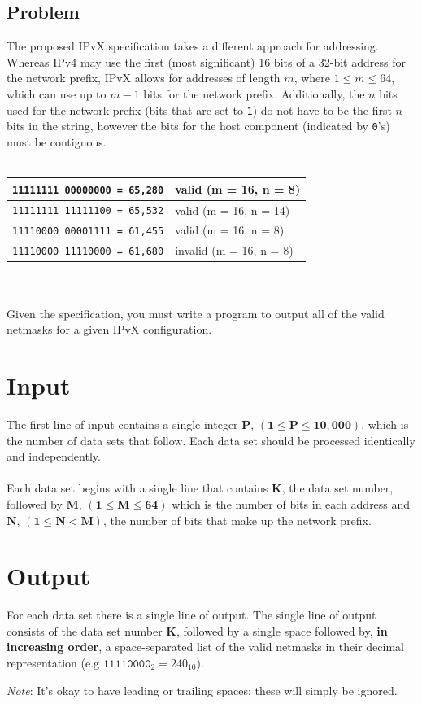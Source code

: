 \documentclass[11pt]{article}
\begin{document}
\subsection{Problem}
The proposed IPvX specification takes a different approach for addressing. Whereas IPv4 may use the first (most significant) 16 bits of a 32-bit address for the network prefix, IPvX allows for addresses of length $m$, where $1 \le m \le 64$, which can use up to $m-1$ bits for the network prefix. Additionally, the $n$ bits used for the network prefix (bits that are set to \texttt{1}) do not have to be the first $n$ bits in the string, however the bits for the host component (indicated by \texttt{0}'s) must be contiguous.
\\\\ 
\begin{tabularx}{\textwidth}{|X|X|}
	\hline
	\texttt{11111111 00000000 = 65,280} & valid (m = 16, n = 8)\\ \hline
	\texttt{11111111 11111100 = 65,532} & valid (m = 16, n = 14)\\ \hline
	\texttt{11110000 00001111 = 61,455} & valid (m = 16, n = 8)\\ \hline
	\texttt{11110000 11110000 = 61,680} & invalid (m = 16, n = 8)\\ \hline
\end{tabularx}
\\\\
Given the specification, you must write a program to output all of the valid netmasks for a given IPvX configuration.

\section{Input}
The first line of input contains a single integer $\boldsymbol{P}$, $(\boldsymbol{1} \le \boldsymbol{P} \le \boldsymbol{10,000})$, which is the number of data sets that follow. Each
data set should be processed identically and independently.
\\\\
Each data set begins with a single line that contains $\boldsymbol{K}$, the data
set number, followed by $\boldsymbol{M}$, $(\boldsymbol{1} \le \boldsymbol{M} \le \boldsymbol{64})$
which is the number of bits in each address and  $\boldsymbol{N}$,
$(\boldsymbol{1} \le \boldsymbol{N} < \boldsymbol{M})$, the number of bits that make up the network prefix.

\section{Output}
For each data set there is a single line of output. The single line of output
consists of the data set number $\boldsymbol{K}$, followed by a single space
followed by, \textbf{in increasing order}, a space-separated list of the valid netmasks
in their decimal representation (e.g $\texttt{11110000}_2 = 240_{10}$).
\begin{center}\emph{Note}: It's okay to have leading or trailing spaces; these will simply be ignored.\end{center}
\end{document}
